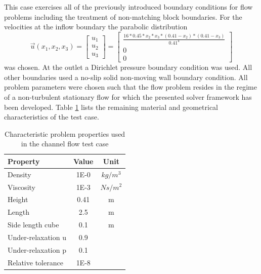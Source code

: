 This case exercises all of the previously introduced boundary conditions for flow problems including the treatment of non-matching block boundaries. For the velocities at the inflow boundary the parabolic distribution
\begin{displaymath}
  \vec{u}(x_1,x_2,x_3) 
  =
\left[
  \begin{array}{ccc}
    u_1 \\
    u_2 \\
    u_3 
  \end{array}
\right]
  =
\left[
  \begin{array}{ccc}
    \frac{ 16 * 0.45 * x_2 * x_3 * \left( 0.41 - x_2 \right) * \left( 0.41 - x_3 \right)}{0.41^4}
    \\[0.9em]
    0 \\[0.3em]
    0 
  \end{array}
\right]
\end{displaymath}
was chosen. At the outlet a Dirichlet pressure boundary condition was used. All other boundaries used a no-slip solid non-moving wall boundary condition. All problem parameters were chosen such that the flow problem resides in the regime of a non-turbulent stationary flow for which the presented solver framework has been developed. Table \ref{tab:channel} lists the remaining material and geometrical characteristics of the test case.

\begin{table}[h!]\centering
  \caption{Characteristic problem properties used in the channel flow test case}
  \begin{tabular}{lcc}\toprule
    Property & Value & Unit \\
    \midrule
    \rowcolor{black!20} Density            & 1E-0 & $kg/m^3$  \\
    \rowcolor{black!00} Viscosity          & 1E-3 & $Ns/m^2$  \\
    \rowcolor{black!20} Height             & 0.41 & m         \\
    \rowcolor{black!00} Length             & 2.5  & m         \\
    \rowcolor{black!20} Side length cube   & 0.1  & m   \\
    \rowcolor{black!00} Under-relaxation u & 0.9  &    \\
    \rowcolor{black!20} Under-relaxation p & 0.1  &    \\
    \rowcolor{black!00} Relative tolerance & 1E-8      &
  \end{tabular}
  \label{tab:channel}
\end{table}


